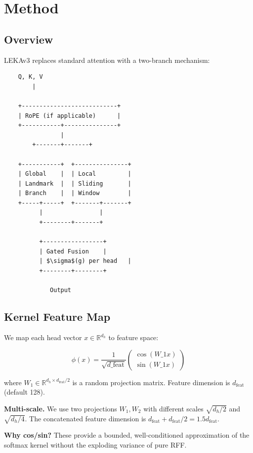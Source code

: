 \section{Method}

\subsection{Overview}

LEKAv3 replaces standard attention with a two-branch mechanism:

\begin{lstlisting}
    Q, K, V
        |
         
    +---------------------------+
    | RoPE (if applicable)      |
    +-----------+---------------+
                |
        +-------+-------+
                         
    +-----------+  +---------------+
    | Global    |  | Local         |
    | Landmark  |  | Sliding       |
    | Branch    |  | Window        |
    +-----+-----+  +-------+-------+
          |                |
          +--------+-------+
                    
          +-----------------+
          | Gated Fusion    |
          | $\sigma$(g) per head   |
          +--------+--------+
                    
             Output
\end{lstlisting}

\subsection{Kernel Feature Map}

We map each head vector $x \in \mathbb{R}^{d_h}$ to feature space:

\[
\phi(x) = \frac{1}{\sqrt{d\_\text{feat}}} \begin{pmatrix} \cos(W\_1 x) \\ \sin(W\_1 x) \end{pmatrix}
\tag{4.1}
\]

where $W_1 \in \mathbb{R}^{d_h \times d_\text{feat}/2}$ is a random 
projection matrix. Feature dimension is $d_\text{feat}$ (default 128).

\textbf{Multi-scale.} We use two projections $W_1, W_2$ with different scales 
$\sqrt{d_h/2}$ and $\sqrt{d_h/4}$. The concatenated feature dimension is 
$d_\text{feat} + d_\text{feat}/2 = 1.5 d_\text{feat}$.

\textbf{Why cos/sin?} These provide a bounded, well-conditioned approximation 
of the softmax kernel without the exploding variance of pure RFF.

